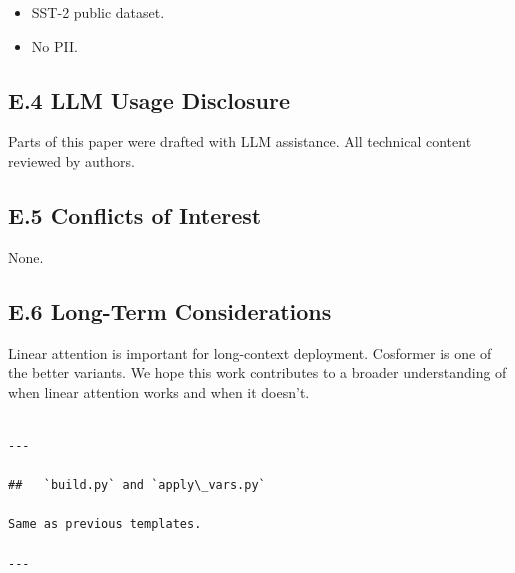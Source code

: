 \begin{itemize}
\item SST-2 public dataset.
\item No PII.

\end{itemize}
\subsection{E.4 LLM Usage Disclosure}

Parts of this paper were drafted with LLM assistance. All technical content 
reviewed by authors.

\subsection{E.5 Conflicts of Interest}

None.

\subsection{E.6 Long-Term Considerations}

Linear attention is important for long-context deployment. Cosformer is one 
of the better variants. We hope this work contributes to a broader 
understanding of when linear attention works and when it doesn't.
\begin{lstlisting}

---

##   `build.py` and `apply\_vars.py`

Same as previous templates.

---
\end{lstlisting}

